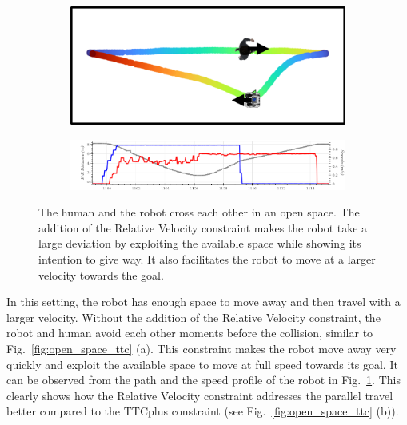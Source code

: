 \begin{figure}[H]
\centering

\begin{subfigure}{0.5\columnwidth}
  \includegraphics[width=\textwidth]{images/appendix/relvel/wide/with.png}
\end{subfigure}
\begin{subfigure}{0.8\columnwidth}
  \includegraphics[width=\textwidth]{images/appendix/relvel/wide/with2.png}
\end{subfigure}
\caption{The human and the robot cross each other in an open space. The addition of the Relative Velocity constraint makes the robot take a large deviation by exploiting the available space while showing its intention to give way. It also facilitates the robot to move at a larger velocity towards the goal.}
\label{fig:wide_rel}
\end{figure}

\hspace{\parindent} In this setting, the robot has enough space to move away and then travel with a larger velocity. Without the addition of the Relative Velocity constraint, the robot and human avoid each other moments before the collision, similar to Fig.~\ref{fig:open_space_ttc} (a). This constraint makes the robot move away very quickly and exploit the available space to move at full speed towards its goal. It can be observed from the path and the speed profile of the robot in Fig.~\ref{fig:wide_rel}. This clearly shows how the Relative Velocity constraint addresses the parallel travel better compared to the TTCplus constraint (see Fig.~\ref{fig:open_space_ttc} (b)).

